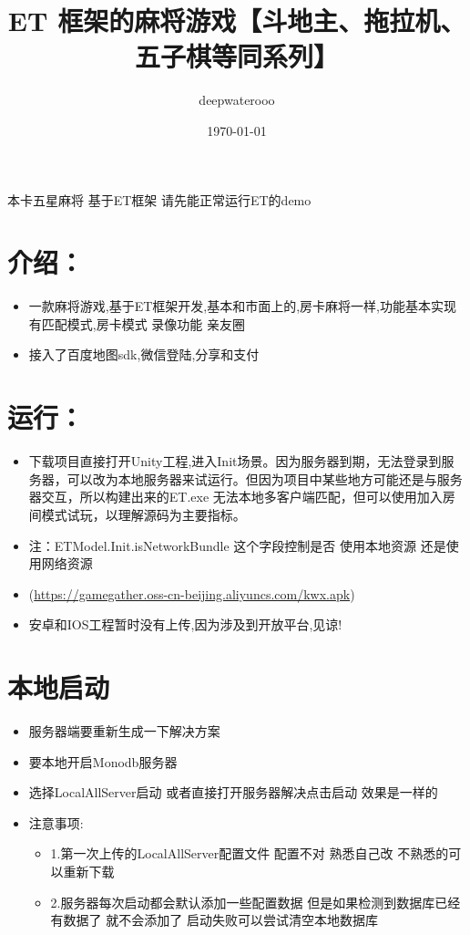 \documentclass[9pt, b5paper]{article}
\author{deepwaterooo}
\date{\today}
\title{ET 框架的麻将游戏【斗地主、拖拉机、五子棋等同系列】}
\begin{document}
\maketitle
\tableofcontents

本卡五星麻将 基于ET框架 请先能正常运行ET的demo  

\section{介绍：}
\label{sec:org9777ba5}
\begin{itemize}
\item 一款麻将游戏,基于ET框架开发,基本和市面上的,房卡麻将一样,功能基本实现 有匹配模式,房卡模式 录像功能 亲友圈
\item 接入了百度地图sdk,微信登陆,分享和支付
\end{itemize}

\section{运行：}
\label{sec:org64d73aa}
\begin{itemize}
\item 下载项目直接打开Unity工程,进入Init场景。因为服务器到期，无法登录到服务器，可以改为本地服务器来试运行。但因为项目中某些地方可能还是与服务器交互，所以构建出来的ET.exe 无法本地多客户端匹配，但可以使用加入房间模式试玩，以理解源码为主要指标。
\item 注：ETModel.Init.isNetworkBundle 这个字段控制是否 使用本地资源 还是使用网络资源
\item\relax [打好包apk下载](\url{https://gamegather.oss-cn-beijing.aliyuncs.com/kwx.apk})
\item 安卓和IOS工程暂时没有上传,因为涉及到开放平台,见谅!
\end{itemize}

\section{本地启动}
\label{sec:org1e0f300}
\begin{itemize}
\item 服务器端要重新生成一下解决方案
\item 要本地开启Monodb服务器
\item 选择LocalAllServer启动 或者直接打开服务器解决点击启动 效果是一样的

\item 注意事项:  
\begin{itemize}
\item 1.第一次上传的LocalAllServer配置文件 配置不对 熟悉自己改 不熟悉的可以重新下载
\item 2.服务器每次启动都会默认添加一些配置数据 但是如果检测到数据库已经有数据了 就不会添加了 启动失败可以尝试清空本地数据库
\end{itemize}
\end{itemize}
\end{document}
